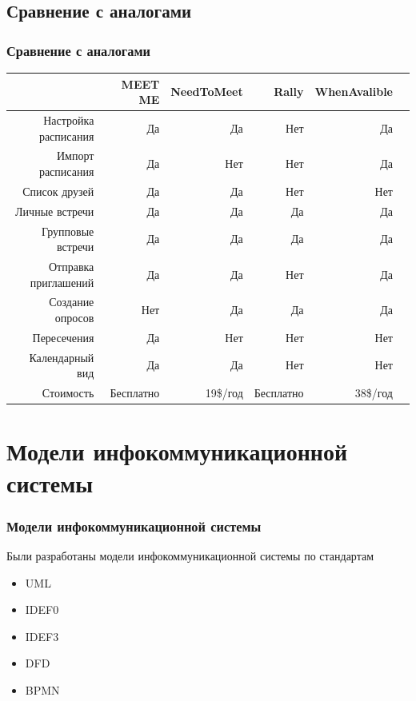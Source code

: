 \documentclass[aspectratio=169]{beamer}
\begin{document}
\subsection{Сравнение с аналогами}
\begin{frame}
    \frametitle{Сравнение с аналогами}
    
    
    \begin{table} 
    \begin{tabular}{r | r r r r r} 
              & MEET ME &  NeedToMeet &  Rally & WhenAvalible \\ \hline
             Настройка расписания    & Да  & Да  & Нет & Да \\
             Импорт расписания       & Да  & Нет & Нет & Да \\
             Список друзей           & Да  & Да  & Нет & Нет \\
             Личные встречи          & Да  & Да  & Да  & Да \\
             Групповые встречи       & Да  & Да  & Да  & Да \\
             Отправка приглашений    & Да  & Да  & Нет & Да \\
             Создание опросов        & Нет & Да  & Да  & Да \\
             Пересечения & Да  & Нет & Нет & Нет \\
             Календарный вид         & Да  & Да  & Нет & Нет \\
             Стоимость               & Бесплатно & 19\$/год & Бесплатно & 38\$/год \\
    \end{tabular} 
    \end{table}
    \end{frame}


\section{Модели инфокоммуникационной системы}
\begin{frame}
    \frametitle{Модели инфокоммуникационной системы}
    Были разработаны модели инфокоммуникационной системы по стандартам 
    \begin{itemize}
        \item UML 
        \item IDEF0 
        \item IDEF3 
        \item DFD
        \item BPMN
    \end{itemize}
\end{frame}
\end{document}
